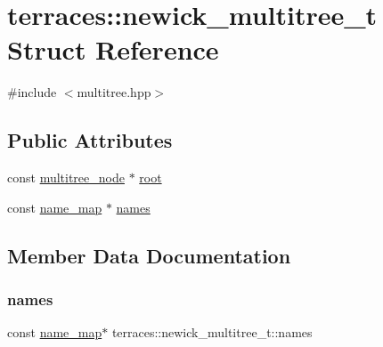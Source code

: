 \hypertarget{structterraces_1_1newick__multitree__t}{}\section{terraces\+:\+:newick\+\_\+multitree\+\_\+t Struct Reference}
\label{structterraces_1_1newick__multitree__t}


{\ttfamily \#include $<$multitree.\+hpp$>$}

\subsection*{Public Attributes}
\begin{DoxyCompactItemize}
\item 
const \hyperlink{structterraces_1_1multitree__node}{multitree\+\_\+node} $\ast$ \hyperlink{structterraces_1_1newick__multitree__t_ad0bfc2a73528f80fe9cbb45bb1660f0f}{root}
\item 
const \hyperlink{namespaceterraces_a4ef0217fe5aed881737d9bc5a8d45dca}{name\+\_\+map} $\ast$ \hyperlink{structterraces_1_1newick__multitree__t_ab4ed2a5756f1facd5b778718855ba051}{names}
\end{DoxyCompactItemize}


\subsection{Member Data Documentation}
\mbox{\label{structterraces_1_1newick__multitree__t_ab4ed2a5756f1facd5b778718855ba051}} 
\subsubsection{\texorpdfstring{names}{names}}
{\footnotesize\ttfamily const \hyperlink{namespaceterraces_a4ef0217fe5aed881737d9bc5a8d45dca}{name\+\_\+map}$\ast$ terraces\+::newick\+\_\+multitree\+\_\+t\+::names}

\mbox{\label{structterraces_1_1newick__multitree__t_ad0bfc2a73528f80fe9cbb45bb1660f0f}} 
